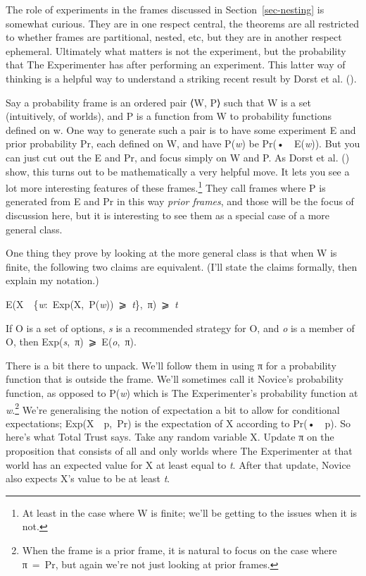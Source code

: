 \documentclass[
  10pt,
  letterpaper,
  DIV=11,
  numbers=noendperiod,
  twoside]{scrartcl}
\providecommand{\tightlist}{%
  \setlength{\itemsep}{0pt}\setlength{\parskip}{0pt}}\usepackage{longtable,booktabs,array}
\begin{document}
The role of experiments in the frames discussed in
Section~\ref{sec-nesting} is somewhat curious. They are in one respect
central, the theorems are all restricted to whether frames are
partitional, nested, etc, but they are in another respect ephemeral.
Ultimately what matters is not the experiment, but the probability that
The Experimenter has after performing an experiment. This latter way of
thinking is a helpful way to understand a striking recent result by
Dorst et al. ().

Say a probability frame is an ordered pair ⟨W, P⟩ such that W is a set
(intuitively, of worlds), and P is a function from W to probability
functions defined on w. One way to generate such a pair is to have some
experiment E and prior probability Pr, each defined on W, and have
P(\emph{w}) be Pr(•~\textbar~E(\emph{w})). But you can just cut out the
E and Pr, and focus simply on W and P. As Dorst et al.
() show, this turns out to be
mathematically a very helpful move. It lets you see a lot more
interesting features of these frames.\footnote{At least in the case
  where W is finite; we'll be getting to the issues when it is not.}
They call frames where P is generated from E and Pr in this way
\emph{prior frames}, and those will be the focus of discussion here, but
it is interesting to see them as a special case of a more general class.

One thing they prove by looking at the more general class is that when W
is finite, the following two claims are equivalent. (I'll state the
claims formally, then explain my notation.)

\begin{description}
\tightlist
\item[Total Trust]
E(X~\textbar~\{\emph{w}:~Exp(X,~P(\emph{w}))~⩾~\emph{t}\},~π)~⩾~\emph{t}
\item[Value]
If O is a set of options, \emph{s} is a recommended strategy for O, and
\emph{o} is a member of O, then Exp(\emph{s},~π)~⩾~E(\emph{o},~π).
\end{description}

There is a bit there to unpack. We'll follow them in using π for a
probability function that is outside the frame. We'll sometimes call it
Novice's probability function, as opposed to P(\emph{w}) which is The
Experimenter's probability function at \emph{w}.\footnote{When the frame
  is a prior frame, it is natural to focus on the case where π~=~Pr, but
  again we're not just looking at prior frames.} We're generalising the
notion of expectation a bit to allow for conditional expectations;
Exp(X~\textbar~p,~Pr) is the expectation of X according to
Pr(•~\textbar~p). So here's what Total Trust says. Take any random
variable X. Update π on the proposition that consists of all and only
worlds where The Experimenter at that world has an expected value for X
at least equal to \emph{t}. After that update, Novice also expects X's
value to be at least \emph{t}.
\end{document}
